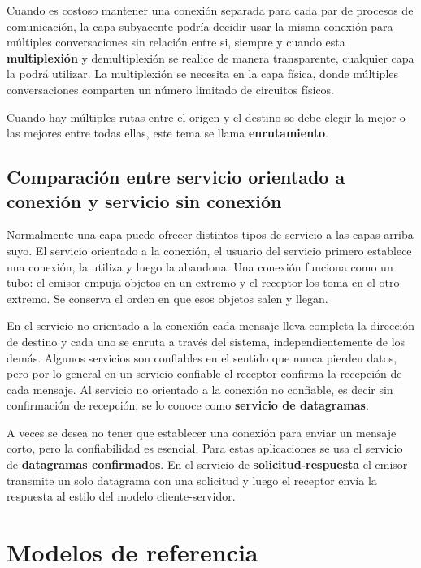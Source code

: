 \documentclass[10pt,a4paper]{report}
\begin{document}
\par Cuando es costoso mantener una conexión separada para cada par de procesos 
de comunicación, la capa subyacente podría decidir usar la misma conexión para 
múltiples conversaciones sin relación entre si, siempre y cuando esta 
\textbf{multiplexión} y demultiplexión se realice de manera transparente, cualquier 
capa la podrá utilizar. La multiplexión se necesita en la capa física, donde múltiples 
conversaciones comparten un número limitado de circuitos físicos.

\par Cuando hay múltiples rutas entre el origen y el destino se debe elegir la mejor o 
las mejores entre todas ellas, este tema se llama \textbf{enrutamiento}.

\subsection{Comparación entre servicio orientado a conexión y servicio sin conexión}
\par Normalmente una capa puede ofrecer distintos tipos de servicio a las capas arriba 
suyo. El servicio orientado a la conexión, el usuario del servicio primero establece una 
conexión, la utiliza y luego la abandona. Una conexión funciona como un tubo: el 
emisor empuja objetos en un extremo y el receptor los toma en el otro extremo. Se 
conserva el orden en que esos objetos salen y llegan.
\par En el servicio no orientado a la conexión cada mensaje lleva completa la dirección 
de destino y cada uno se enruta a través del sistema, independientemente de los 
demás. Algunos servicios son confiables en el sentido que nunca pierden datos, pero 
por lo general en un servicio confiable el receptor confirma la recepción de cada 
mensaje. Al servicio no orientado a la conexión no confiable, es decir sin confirmación 
de recepción, se lo conoce como \textbf{servicio de datagramas}. 
\par A veces se desea no tener que establecer una conexión para enviar un mensaje 
corto, pero la confiabilidad es esencial. Para estas aplicaciones se usa el servicio de 
\textbf{datagramas confirmados}. En el servicio de \textbf{solicitud-respuesta} el 
emisor transmite un solo datagrama con una solicitud y luego el receptor envía la 
respuesta al estilo del modelo cliente-servidor.


\section{Modelos de referencia}
\end{document}
